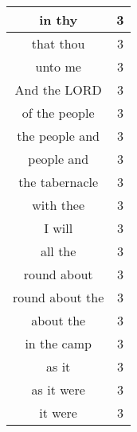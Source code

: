 \begin{center}
\begin{longtable}{|c|c|}
in thy & 3\\ \hline 
that thou & 3\\ \hline 
unto me & 3\\ \hline 
And the LORD & 3\\ \hline 
of the people & 3\\ \hline 
the people and & 3\\ \hline 
people and & 3\\ \hline 
the tabernacle & 3\\ \hline 
with thee & 3\\ \hline 
I will & 3\\ \hline 
all the & 3\\ \hline 
round about & 3\\ \hline 
round about the & 3\\ \hline 
about the & 3\\ \hline 
in the camp & 3\\ \hline 
as it & 3\\ \hline 
as it were & 3\\ \hline 
it were & 3\\ \hline 
\end{longtable}
\end{center}





